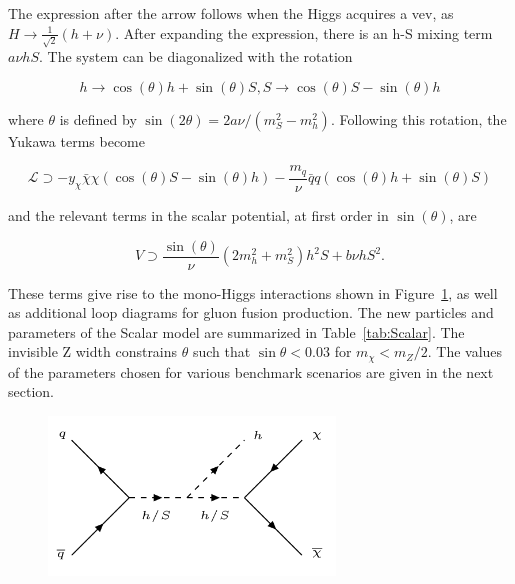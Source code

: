 The expression after the arrow follows when the Higgs acquires a vev, as $H \rightarrow \frac{1}{\sqrt{2}} (h + \nu)$. After expanding the expression, there is an h-S mixing term $a\nu hS$. The system can be diagonalized with the rotation

\begin{equation}
h \rightarrow \cos(\theta) h + \sin(\theta) S, S \rightarrow \cos(\theta) S - \sin(\theta) h
\end{equation}

where $\theta$ is defined by $\sin(2\theta) = 2a\nu/(m_S^2-m_h^2)$. Following this rotation, the Yukawa terms become

\begin{equation}
\mathcal{L} \supset -y_\chi \bar{\chi} \chi (\cos(\theta) S - \sin(\theta) h) - \frac{m_q}{\nu} \bar{q} q (\cos(\theta) h + \sin(\theta) S)
\end{equation}

and the relevant terms in the scalar potential, at first order in $\sin(\theta)$, are

\begin{equation}
V \supset \frac{\sin(\theta)}{\nu}(2m_h^2 + m_S^2) h^2 S + b \nu h S^2.
\end{equation}

These terms give rise to the mono-Higgs interactions shown in Figure~\ref{fig:scsig}, as well as additional loop diagrams for gluon fusion production. The new particles and parameters of the Scalar model are summarized in Table~\ref{tab:Scalar}. The invisible Z width constrains $\theta$ such that $\sin\theta < 0.03$ for $m_\chi < m_Z/2$. The values of the parameters chosen for various benchmark scenarios are given in the next section.

\begin{figure}[tbh]
\centering
\includegraphics[width=3in]{figures/scsig.png}
\caption{}
\label{fig:scsig}
\end{figure}

